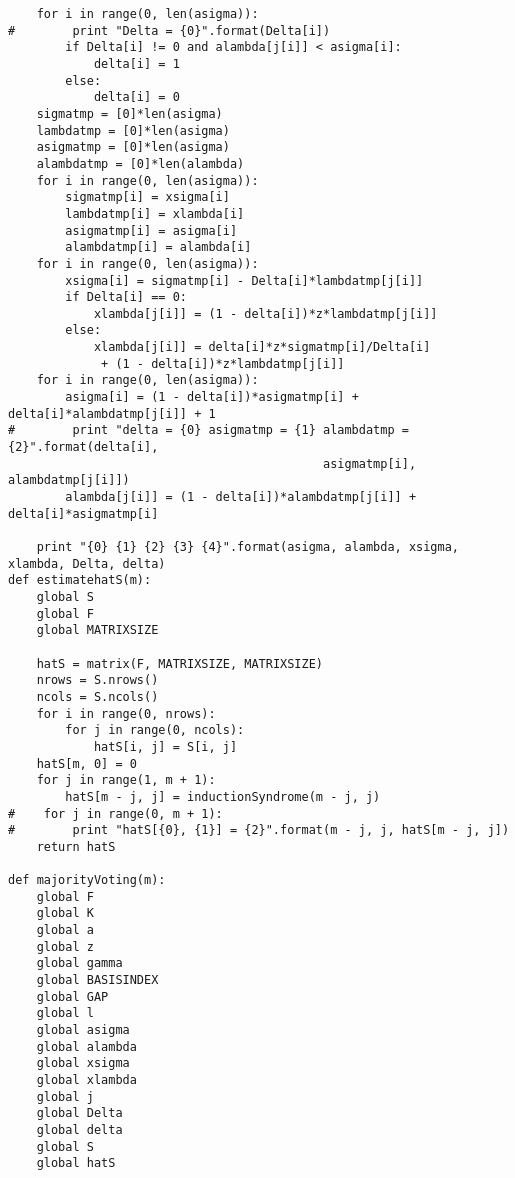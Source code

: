 \documentclass[12pt]{jarticle}
\theoremstyle{break}
\begin{document}
\begin{verbatim}
    for i in range(0, len(asigma)):
#        print "Delta = {0}".format(Delta[i])
        if Delta[i] != 0 and alambda[j[i]] < asigma[i]:
            delta[i] = 1
        else:
            delta[i] = 0
    sigmatmp = [0]*len(asigma)
    lambdatmp = [0]*len(asigma)
    asigmatmp = [0]*len(asigma)
    alambdatmp = [0]*len(alambda)
    for i in range(0, len(asigma)):
        sigmatmp[i] = xsigma[i]
        lambdatmp[i] = xlambda[i]
        asigmatmp[i] = asigma[i]
        alambdatmp[i] = alambda[i]
    for i in range(0, len(asigma)):
        xsigma[i] = sigmatmp[i] - Delta[i]*lambdatmp[j[i]]
        if Delta[i] == 0:
            xlambda[j[i]] = (1 - delta[i])*z*lambdatmp[j[i]]
        else:
            xlambda[j[i]] = delta[i]*z*sigmatmp[i]/Delta[i]
             + (1 - delta[i])*z*lambdatmp[j[i]]
    for i in range(0, len(asigma)):
        asigma[i] = (1 - delta[i])*asigmatmp[i] + delta[i]*alambdatmp[j[i]] + 1
#        print "delta = {0} asigmatmp = {1} alambdatmp = {2}".format(delta[i], 
											asigmatmp[i], alambdatmp[j[i]])
        alambda[j[i]] = (1 - delta[i])*alambdatmp[j[i]] + delta[i]*asigmatmp[i]

    print "{0} {1} {2} {3} {4}".format(asigma, alambda, xsigma, xlambda, Delta, delta)
def estimatehatS(m):
    global S
    global F
    global MATRIXSIZE
    
    hatS = matrix(F, MATRIXSIZE, MATRIXSIZE)
    nrows = S.nrows()
    ncols = S.ncols()
    for i in range(0, nrows):
        for j in range(0, ncols):
            hatS[i, j] = S[i, j]
    hatS[m, 0] = 0
    for j in range(1, m + 1):
        hatS[m - j, j] = inductionSyndrome(m - j, j) 
#    for j in range(0, m + 1):
#        print "hatS[{0}, {1}] = {2}".format(m - j, j, hatS[m - j, j])
    return hatS
    
def majorityVoting(m):
    global F
    global K
    global a
    global z
    global gamma
    global BASISINDEX
    global GAP
    global l
    global asigma
    global alambda
    global xsigma
    global xlambda    
    global j
    global Delta
    global delta
    global S
    global hatS


\end{verbatim}
\end{document}
